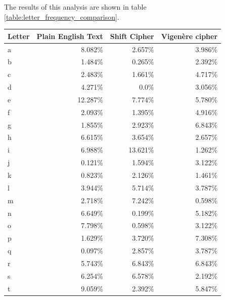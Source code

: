 \documentclass[a4paper]{article}
\newcommand{\Vigenere}{Vigen\`{e}re }
\begin{document}
The results of this analysis are shown in table
\ref{table:letter_frequency_comparison}.

\begin{table}[h]
  \centering
    \scriptsize
  \begin{tabular}{@{}lrrr@{}}
    \toprule
    Letter & Plain English Text & Shift Cipher & \Vigenere cipher \\
    \midrule
    a      & 8.082\%            & 2.657\%      & 3.986\%          \\
    b      & 1.484\%            & 0.265\%      & 2.392\%          \\
    c      & 2.483\%            & 1.661\%      & 4.717\%          \\
    d      & 4.271\%            & 0.0\%        & 3.056\%          \\
    e      & 12.287\%           & 7.774\%      & 5.780\%          \\
    f      & 2.093\%            & 1.395\%      & 4.916\%          \\
    g      & 1.855\%            & 2.923\%      & 6.843\%          \\
    h      & 6.615\%            & 3.654\%      & 2.657\%          \\
    i      & 6.988\%            & 13.621\%     & 1.262\%          \\
    j      & 0.121\%            & 1.594\%      & 3.122\%          \\
    k      & 0.823\%            & 2.126\%      & 1.461\%          \\
    l      & 3.944\%            & 5.714\%      & 3.787\%          \\
    m      & 2.718\%            & 7.242\%      & 0.598\%          \\
    n      & 6.649\%            & 0.199\%      & 5.182\%          \\
    o      & 7.798\%            & 0.598\%      & 3.122\%          \\
    p      & 1.629\%            & 3.720\%      & 7.308\%          \\
    q      & 0.097\%            & 2.857\%      & 3.787\%          \\
    r      & 5.743\%            & 6.843\%      & 6.843\%          \\
    s      & 6.254\%            & 6.578\%      & 2.192\%          \\
    t      & 9.059\%            & 2.392\%      & 5.847\%          \\

\end{tabular}
\end{table}
\end{document}
